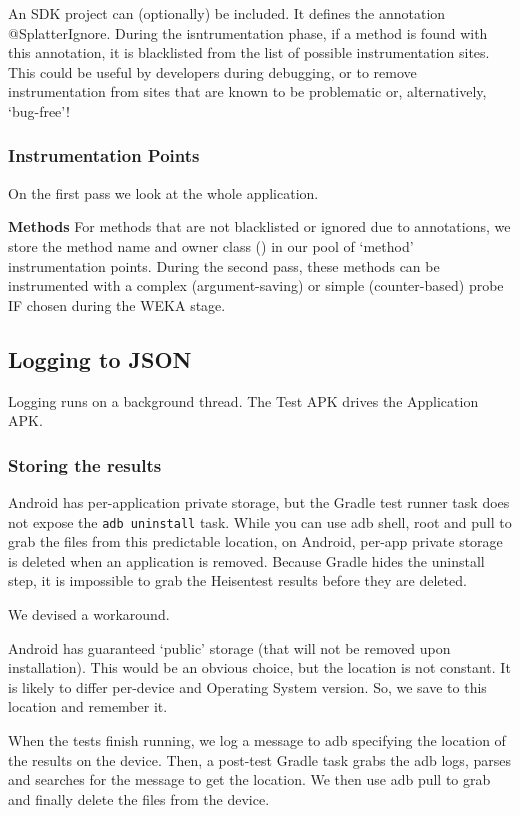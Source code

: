 An SDK project can (optionally) be included. It defines the annotation @SplatterIgnore. During the isntrumentation phase, if a method is found with this annotation, it is blacklisted from the list of possible instrumentation sites. This could be useful by developers during debugging, or to remove instrumentation from sites that are known to be problematic or, alternatively, {\lq}bug-free{\rq}!

\subsubsection{Instrumentation Points}
On the first pass we look at the whole application.

\textbf{Methods}
For methods that are not blacklisted or ignored due to annotations, we store the method name and owner class () in our pool of {\lq}method{\rq} instrumentation points. During the second pass, these methods can be instrumented with a complex (argument-saving) or simple (counter-based) probe IF chosen during the WEKA stage.

\subsection{Logging to JSON}

Logging runs on a background thread. The Test APK drives the Application APK.

\subsubsection{Storing the results}

Android has per-application private storage, but the Gradle test runner task does not expose the \texttt{adb uninstall} task. While you can use adb shell, root and pull to grab the files from this predictable location, on Android, per-app private storage is deleted when an application is removed. Because Gradle hides the uninstall step, it is impossible to grab the Heisentest results before they are deleted.

We devised a workaround.

Android has guaranteed {\lq}public{\rq} storage (that will not be removed upon installation). This would be an obvious choice, but the location is not constant. It is likely to differ per-device and Operating System version. So, we save to this location and remember it.

When the tests finish running, we log a message to adb specifying the location of the results on the device. Then, a post-test Gradle task grabs the adb logs, parses and searches for the message to get the location. We then use adb pull to grab and finally delete the files from the device.

